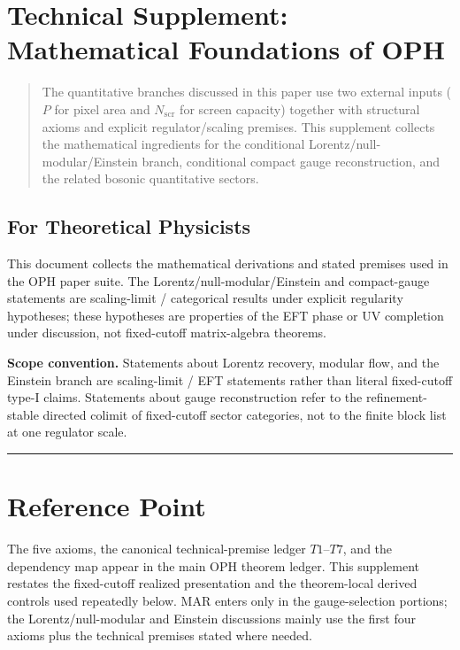 \section{Technical Supplement: Mathematical Foundations of OPH}\label{technical-supplement-mathematical-foundations-of-observer-patch-holography}

\begin{quote}
The quantitative branches discussed in this paper use two external inputs (\(P\) for pixel area and \(N_{\mathrm{scr}}\) for screen capacity) together with structural axioms and explicit regulator/scaling premises. This supplement collects the mathematical ingredients for the conditional Lorentz/null-modular/Einstein branch, conditional compact gauge reconstruction, and the related bosonic quantitative sectors.
\end{quote}

\subsection{For Theoretical Physicists}\label{for-theoretical-physicists}

This document collects the mathematical derivations and stated premises used in the OPH paper suite. The Lorentz/null-modular/Einstein and compact-gauge statements are scaling-limit / categorical results under explicit regularity hypotheses; these hypotheses are properties of the EFT phase or UV completion under discussion, not fixed-cutoff matrix-algebra theorems.

\textbf{Scope convention.} Statements about Lorentz recovery, modular flow, and the Einstein branch are scaling-limit / EFT statements rather than literal fixed-cutoff type-I claims. Statements about gauge reconstruction refer to the refinement-stable directed colimit of fixed-cutoff sector categories, not to the finite block list at one regulator scale.

\begin{center}\rule{0.5\linewidth}{0.5pt}\end{center}

\section{Reference Point}\label{1-core-axioms-and-definitions}

The five axioms, the canonical technical-premise ledger \(T1\)--\(T7\), and the dependency map appear in the main OPH theorem ledger. This supplement restates the fixed-cutoff realized presentation and the theorem-local derived controls used repeatedly below. MAR enters only in the gauge-selection portions; the Lorentz/null-modular and Einstein discussions mainly use the first four axioms plus the technical premises stated where needed.

